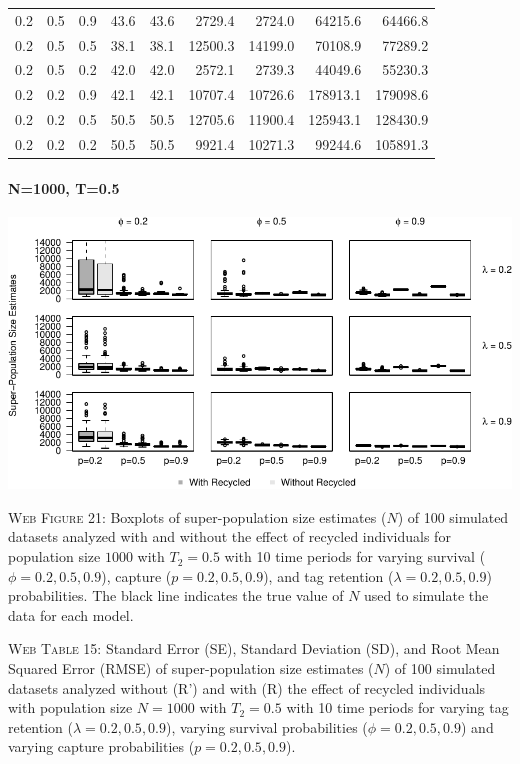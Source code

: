 \documentclass[]{article}
\let\oldparagraph\paragraph
\renewcommand{\paragraph}[1]{\oldparagraph{#1}\mbox{}}
\begin{document}
\begin{table}[ht]
{\begin{tabular}{rrrrrrrrr}
  0.2 & 0.5 & 0.9 & 43.6 & 43.6 & 2729.4 & 2724.0 & 64215.6 & 64466.8 \\ 
  0.2 & 0.5 & 0.5 & 38.1 & 38.1 & 12500.3 & 14199.0 & 70108.9 & 77289.2 \\ 
  0.2 & 0.5 & 0.2 & 42.0 & 42.0 & 2572.1 & 2739.3 & 44049.6 & 55230.3 \\ 
  0.2 & 0.2 & 0.9 & 42.1 & 42.1 & 10707.4 & 10726.6 & 178913.1 & 179098.6 \\ 
  0.2 & 0.2 & 0.5 & 50.5 & 50.5 & 12705.6 & 11900.4 & 125943.1 & 128430.9 \\ 
  0.2 & 0.2 & 0.2 & 50.5 & 50.5 & 9921.4 & 10271.3 & 99244.6 & 105891.3 \\ 
   \hline
\end{tabular}
}
\endgroup
\end{table}

\newpage

\paragraph{N=1000, T=0.5}\label{n1000-t0.5-3}

\includegraphics{Appendix_BW_files/figure-latex/figure21_superN_GJSTL4-1.pdf}

\textsc{Web Figure 21:} Boxplots of super-population size estimates
(\(N\)) of 100 simulated datasets analyzed with and without the effect
of recycled individuals for population size \(1000\) with \(T_2=0.5\)
with 10 time periods for varying survival (\(\phi=0.2,0.5,0.9\)),
capture (\(p=0.2,0.5,0.9\)), and tag retention (\(\lambda=0.2,0.5,0.9\))
probabilities. The black line indicates the true value of \(N\) used to
simulate the data for each model.

\textsc{Web Table 15:} Standard Error (SE), Standard Deviation (SD), and
Root Mean Squared Error (RMSE) of super-population size estimates
(\(N\)) of 100 simulated datasets analyzed without (R') and with (R) the
effect of recycled individuals with population size \(N=1000\) with
\(T_2=0.5\) with 10 time periods for varying tag retention
(\(\lambda=0.2,0.5,0.9\)), varying survival probabilities
(\(\phi=0.2,0.5,0.9\)) and varying capture probabilities
(\(p=0.2,0.5,0.9\)).
\end{document}
